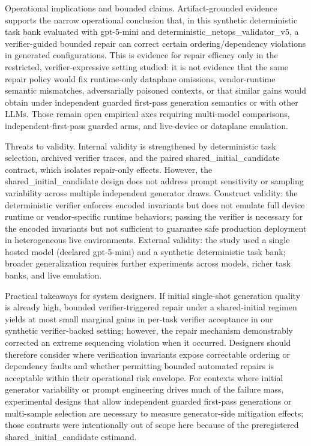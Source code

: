 \documentclass[conference]{IEEEtran}
\begin{document}
Operational implications and bounded claims. Artifact-grounded evidence supports the narrow operational conclusion that, in this synthetic deterministic task bank evaluated with gpt-5-mini and deterministic\_netops\_validator\_v5, a verifier-guided bounded repair can correct certain ordering/dependency violations in generated configurations. This is evidence for repair efficacy only in the restricted, verifier-expressive setting studied: it is not evidence that the same repair policy would fix runtime-only dataplane omissions, vendor-runtime semantic mismatches, adversarially poisoned contexts, or that similar gains would obtain under independent guarded first-pass generation semantics or with other LLMs. Those remain open empirical axes requiring multi-model comparisons, independent-first-pass guarded arms, and live-device or dataplane emulation.

Threats to validity. Internal validity is strengthened by deterministic task selection, archived verifier traces, and the paired shared\_initial\_candidate contract, which isolates repair-only effects. However, the shared\_initial\_candidate design does not address prompt sensitivity or sampling variability across multiple independent generator draws. Construct validity: the deterministic verifier enforces encoded invariants but does not emulate full device runtime or vendor-specific runtime behaviors; passing the verifier is necessary for the encoded invariants but not sufficient to guarantee safe production deployment in heterogeneous live environments. External validity: the study used a single hosted model (declared gpt-5-mini) and a synthetic deterministic task bank; broader generalization requires further experiments across models, richer task banks, and live emulation.

Practical takeaways for system designers. If initial single-shot generation quality is already high, bounded verifier-triggered repair under a shared-initial regimen yields at most small marginal gains in per-task verifier acceptance in our synthetic verifier-backed setting; however, the repair mechanism demonstrably corrected an extreme sequencing violation when it occurred. Designers should therefore consider where verification invariants expose correctable ordering or dependency faults and whether permitting bounded automated repairs is acceptable within their operational risk envelope. For contexts where initial generator variability or prompt engineering drives much of the failure mass, experimental designs that allow independent guarded first-pass generations or multi-sample selection are necessary to measure generator-side mitigation effects; those contrasts were intentionally out of scope here because of the preregistered shared\_initial\_candidate estimand.
\end{document}
